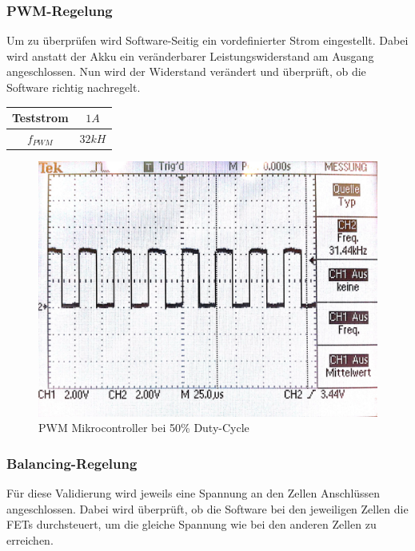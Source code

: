 \subsubsection*{PWM-Regelung}
Um zu überprüfen wird Software-Seitig ein vordefinierter Strom eingestellt. Dabei wird anstatt der Akku ein veränderbarer Leistungswiderstand am Ausgang angeschlossen. Nun wird der Widerstand verändert und überprüft, ob die Software richtig nachregelt.
\begin{center}
	\begin{tabular}{|c|c|}
		\hline 
		Teststrom & $1A$ \\ \hline
		${f}_{PWM}$ & $32kH$ \\ \hline
	\end{tabular} 
	\label{tab:LadestromHighsideDriver}
\end{center}

\begin{figure} [H]
	\centering
	\includegraphics[width=0.5\linewidth]{images/PWM.jpg}
	\caption{PWM Mikrocontroller bei 50\% Duty-Cycle}
	\label{fig:PWM uC}
\end{figure}

\subsubsection{Balancing-Regelung}
Für diese Validierung wird jeweils eine Spannung an den Zellen Anschlüssen angeschlossen. Dabei wird überprüft, ob die Software bei den jeweiligen Zellen die FETs durchsteuert, um  die gleiche Spannung wie bei den anderen Zellen zu erreichen.



